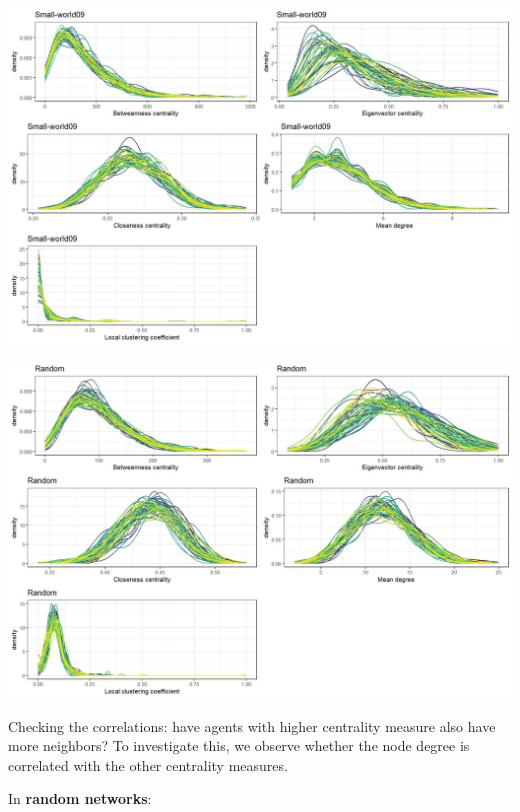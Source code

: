 \documentclass[
]{article}
\begin{document}
\begin{center}\includegraphics{./Figures/unnamed-chunk-192-3} \end{center}

\begin{center}\includegraphics{./Figures/unnamed-chunk-192-4} \end{center}

Checking the correlations: have agents with higher centrality measure
also have more neighbors? To investigate this, we observe whether the
node degree is correlated with the other centrality measures.

In \textbf{random networks}:
\end{document}
